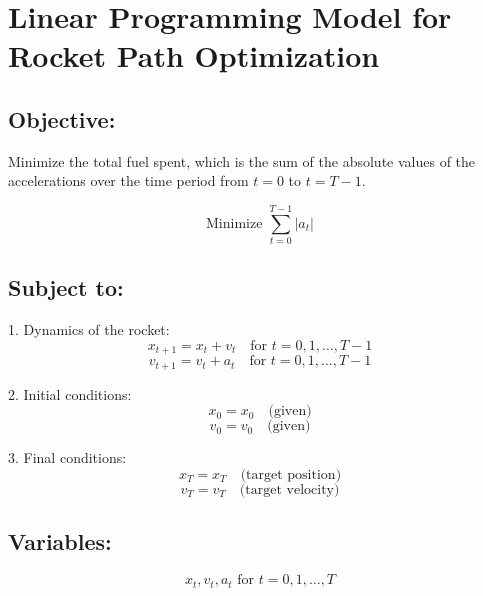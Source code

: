 \documentclass{article}
\begin{document}
\section*{Linear Programming Model for Rocket Path Optimization}

\subsection*{Objective:}
Minimize the total fuel spent, which is the sum of the absolute values of the accelerations over the time period from $t = 0$ to $t = T-1$.

\[
\text{Minimize } \sum_{t=0}^{T-1} |a_t|
\]

\subsection*{Subject to:}
1. Dynamics of the rocket:
   \[
   x_{t+1} = x_t + v_t \quad \text{for } t = 0, 1, \ldots, T-1
   \]
   \[
   v_{t+1} = v_t + a_t \quad \text{for } t = 0, 1, \ldots, T-1
   \]

2. Initial conditions:
   \[
   x_0 = x_0 \quad \text{(given)}
   \]
   \[
   v_0 = v_0 \quad \text{(given)}
   \]

3. Final conditions:
   \[
   x_T = x_T \quad \text{(target position)}
   \]
   \[
   v_T = v_T \quad \text{(target velocity)}
   \]

\subsection*{Variables:}
\[
x_t, v_t, a_t \text{ for } t = 0, 1, \ldots, T
\]
\end{document}
